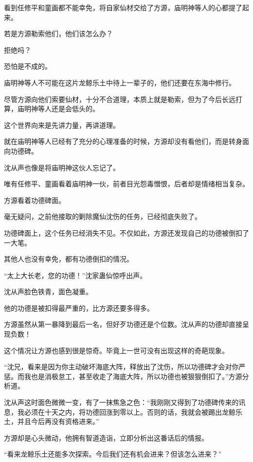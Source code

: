 
\begin{this_body}

看到任修平和童画都不能幸免，将自家仙材交给了方源，庙明神等人的心都提了起来。

若是方源勒索他们，他们该怎么办？

拒绝吗？

恐怕是不成的。

庙明神等人不可能在这片龙鲸乐土中待上一辈子的，他们还要在东海中修行。

尽管方源向他们索要仙材，十分不合道理，本质上就是勒索，但为了今后长远打算，庙明神等人还是会低头的。

这个世界向来是先讲力量，再讲道理。

就在庙明神等人已经有了充分的心理准备的时候，方源却没有看他们，而是转身面向功德碑。

沈从声也像是将庙明神这伙人忘记了。

唯有任修平、童画看着庙明神一伙，前者目光怨毒憎恨，后者却是情绪相当复杂。

方源看着功德碑面。

毫无疑问，之前他接取的剿除魔仙沈伤的任务，已经彻底失败了。

功德碑面上，这个任务已经消失不见。不仅如此，方源还发现自己的功德被倒扣了一大笔。

其他人也没有幸免，都有功德倒扣的情况。

“太上大长老，您的功德！”沈家蛊仙惊呼出声。

沈从声脸色铁青，面色凝重。

他的功德是被扣得最严重的，比方源还要多得多。

方源虽然从第一暴降到最后一名，但好歹功德还是个位数。沈从声的功德却直接呈现负数！

这个情况让方源也感到很是惊奇。毕竟上一世可没有出现这样的奇葩现象。

“沈兄，看来是因为你主动破坏海底大阵，释放出了沈伤，所以功德碑才会对你严惩。而我也是消极怠工，甚至收走了海底大阵，所以功德也被狠狠倒扣了。”方源分析道。

沈从声这时面色微微一变，有了一抹焦急之色：“我刚刚又得到了功德碑传来的讯息，我必须在十天之内，将功德回涨到零以上。否则的话，我就会被踢出龙鲸乐土，并且今后再没有资格进来。”

方源却是心头微动，他拥有智道造诣，立即分析出这番话后的情报。

“看来龙鲸乐土还能多次探索。今后我们还有机会进来？但该怎么进来？”


\end{this_body}
